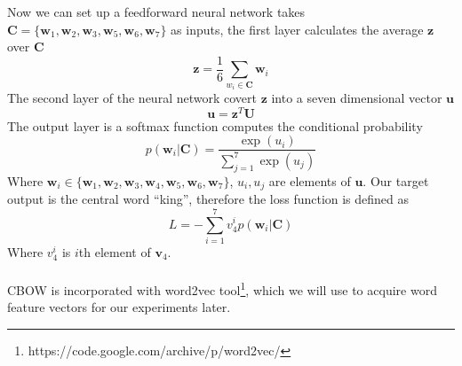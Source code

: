 	Now we can set up a feedforward neural network takes $\mathbf{C} = \{\mathbf{w}_{1},\mathbf{w}_{2},\mathbf{w}_{3},\mathbf{w}_{5},\mathbf{w}_{6},\mathbf{w}_{7}\}$ as inputs, the first layer calculates the average $\mathbf{z}$ over $\mathbf{C}$
	\begin{equation}
		\mathbf{z} = \frac{1}{6}\sum_{w_{i}\in \mathbf{C}} \mathbf{w}_{i}
	\end{equation}
	The second layer of the neural network covert $\mathbf{z}$ into a seven dimensional vector $\mathbf{u}$
	\begin{equation}
		\mathbf{u} = \mathbf{z}^{T}\mathbf{U}
	\end{equation}
	The output layer is a softmax function computes the conditional probability 
	\begin{equation}
	p(\mathbf{w}_{i}|\mathbf{C}) = \frac{\exp(u_{i})}{\sum_{j=1}^{7}\exp(u_{j})}
	\end{equation}
	Where $\mathbf{w}_{i}\in\{\mathbf{w}_{1},\mathbf{w}_{2},\mathbf{w}_{3},\mathbf{w}_{4},\mathbf{w}_{5},\mathbf{w}_{6},\mathbf{w}_{7}\}$, $u_{i},u_{j}$ are elements of $\mathbf{u}$.
	Our target output is the central word ``king'', therefore the loss function is defined as
	\begin{equation}
	L = -\sum_{i=1}^{7}v_{4}^{i}p(\mathbf{w}_{i}|\mathbf{C})
	\end{equation}
	Where $v_{4}^{i}$ is $i$th element of $\mathbf{v}_{4}$.\\\\
	CBOW is incorporated with word2vec tool\footnote{https://code.google.com/archive/p/word2vec/}, which we will use to acquire word feature vectors for our experiments later.
	
